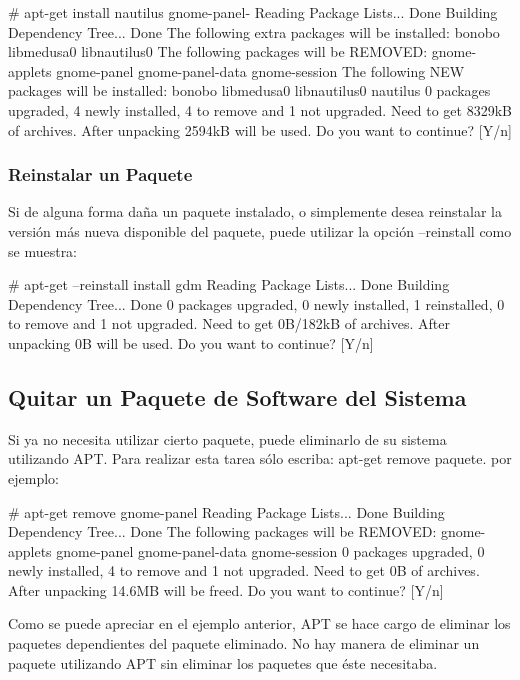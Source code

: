 \documentclass[12pt]{article}
\begin{document}
     # apt-get install nautilus gnome-panel-
     Reading Package Lists... Done
     Building Dependency Tree... Done
     The following extra packages will be installed:
       bonobo libmedusa0 libnautilus0
     The following packages will be REMOVED:
       gnome-applets gnome-panel gnome-panel-data gnome-session
     The following NEW packages will be installed:
       bonobo libmedusa0 libnautilus0 nautilus
     0 packages upgraded, 4 newly installed, 4 to remove and 1 not upgraded.
     Need to get 8329kB of archives. After unpacking 2594kB will be used.
     Do you want to continue? [Y/n]

\subsubsection*{Reinstalar un Paquete}

Si de alguna forma daña un paquete instalado, o simplemente desea reinstalar la versión más nueva disponible del paquete, puede utilizar la opción --reinstall como se muestra:

     # apt-get --reinstall install gdm
     Reading Package Lists... Done
     Building Dependency Tree... Done
     0 packages upgraded, 0 newly installed, 1 reinstalled, 0 to remove and 1 not
      upgraded.
     Need to get 0B/182kB of archives. After unpacking 0B will be used.
     Do you want to continue? [Y/n]



\subsection*{Quitar un Paquete de Software del Sistema}

Si ya no necesita utilizar cierto paquete, puede eliminarlo de su sistema utilizando APT. Para realizar esta tarea sólo escriba: apt-get remove paquete. por ejemplo:

     # apt-get remove gnome-panel
     Reading Package Lists... Done
     Building Dependency Tree... Done
     The following packages will be REMOVED:
       gnome-applets gnome-panel gnome-panel-data gnome-session
     0 packages upgraded, 0 newly installed, 4 to remove and 1 not upgraded.
     Need to get 0B of archives. After unpacking 14.6MB will be freed.
     Do you want to continue? [Y/n]

Como se puede apreciar en el ejemplo anterior, APT se hace cargo de eliminar los paquetes dependientes del paquete eliminado. No hay manera de eliminar un paquete utilizando APT sin eliminar los paquetes que éste necesitaba.
\end{document}
